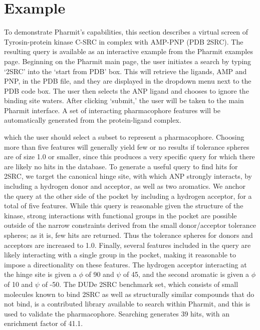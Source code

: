 \section{Example}

To demonstrate Pharmit's capabilities, this section describes a virtual screen of Tyrosin-protein kinase C-SRC in complex with AMP-PNP (PDB 2SRC). The resulting query is available as an interactive example from the Pharmit examples page.
  Beginning on the Pharmit main page, the user initiates a search by typing `2SRC' into the `start from PDB' box. This will retrieve the ligands, AMP and PNP, in the PDB file, and they are displayed in the dropdown menu next to the PDB code box. The user then selects the ANP ligand and chooses to ignore the binding site waters. After clicking `submit,' the user will be taken to the main Pharmit interface. A set of interacting pharmacophore features will be automatically generated from the protein-ligand complex.
  
  which the user should select a subset to represent a pharmacophore. Choosing more than five features will generally yield few or no results if tolerance spheres are of size 1.0 or smaller, since this produces a very specific query for which there are likely no hits in the database. To generate a useful query to find hits for 2SRC, we target the canonical hinge site, with which ANP strongly interacts, by including a hydrogen donor and acceptor, as well as two aromatics. We anchor the query at the other side of the pocket by including a hydrogen acceptor, for a total of five features. While this query is reasonable given the structure of the kinase, strong interactions with functional groups in the pocket are possible outside of the narrow constraints derived from the small donor/acceptor tolerance spheres; as it is, few hits are returned. Thus the tolerance spheres for donors and acceptors are increased to 1.0. Finally, several features included in the query are likely interacting with a single group in the pocket, making it reasonable to impose a directionality on these features. The hydrogen acceptor interacting at the hinge site is given a $\phi$ of 90 and $\psi$ of 45, and the second aromatic is given a $\phi$ of 10 and $\psi$ of -50. The DUDe 2SRC benchmark set, which consists of small molecules known to bind 2SRC as well as structurally similar compounds that do not bind, is a contributed library available to search within Pharmit, and this is used to validate the pharmacophore. Searching generates 39 hits, with an enrichment factor of 41.1. 